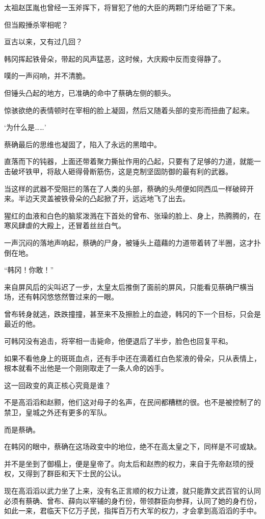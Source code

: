 太祖赵匡胤也曾经一玉斧挥下，将冒犯了他的大臣的两颗门牙给砸了下来。

但当殿捶杀宰相呢？

亘古以来，又有过几回？

韩冈挥起铁骨朵，带起的风声猛恶，这时候，大庆殿中反而变得静了。

噗的一声闷响，并不清脆。

但锤头凸起的地方，已准确的命中了蔡确左侧的额头。

惊骇欲绝的表情顿时在宰相的脸上凝固，然后又随着头部的变形而扭曲了起来。

‘为什么是……’

蔡确最后的思维也凝固了，陷入了永远的黑暗中。

直落而下的钝器，上面还带着聚力撕扯作用的凸起，只要有了足够的力道，就能一击破坏铁甲，将敌人砸得骨断筋伤，这是克制坚固防御的最有利的武器。

当这样的武器不受阻拦的落在了人类的头部，蔡确的头颅便如同西瓜一样破碎开来。半边天灵盖被铁骨朵的凸起掀了开，远远地飞了出去。

猩红的血液和白色的脑浆泼溅在下首处的曾布、张璪的脸上、身上，热腾腾的，在寒风肆虐的大殿上，还冒着丝丝白气。

一声沉闷的落地声响起，蔡确的尸身，被锤头上蕴藉的力道带着转了半圈，这才扑倒在地。

“韩冈！你敢！”

来自屏风后的尖叫迟了一步，太皇太后推倒了面前的屏风，只能看见蔡确尸横当场，还有韩冈悠悠然瞥过来的一眼。

曾布转身就逃，跌跌撞撞，甚至来不及擦脸上的血迹，韩冈的下一个目标，只会是最近的他。

可韩冈没有追击，将宰相一击毙命，他便退后了半步，脸色也回复平和。

如果不看他身上的斑斑血点，还有手中还在滴着红白色浆液的骨朵，只从表情上，根本就看不出他是一个刚刚取走了一条人命的凶手。

这一回政变的真正核心究竟是谁？

不是高滔滔和赵颢，他们这对母子的名声，在民间都糟糕的很。也不是被控制了的禁卫，皇城之外还有更多的军队。

而是蔡确。

在韩冈的眼中，蔡确在这场政变中的地位，绝不在高太皇之下，同样是不可或缺。

并不是坐到了御榻上，便是皇帝了。向太后和赵煦的权力，来自于先帝赵顼的授权，又得到了群臣和天下士民的公认。

现在高滔滔以武力坐了上来，没有名正言顺的权力让渡，就只能靠文武百官的认同必须有蔡确、曾布、薛向以宰辅的身冇份，带领群臣向参拜，认同了她的身冇份，如此一来，君临天下亿万子民，指挥百万冇大军的权力，才会拿到高滔滔的手中。


